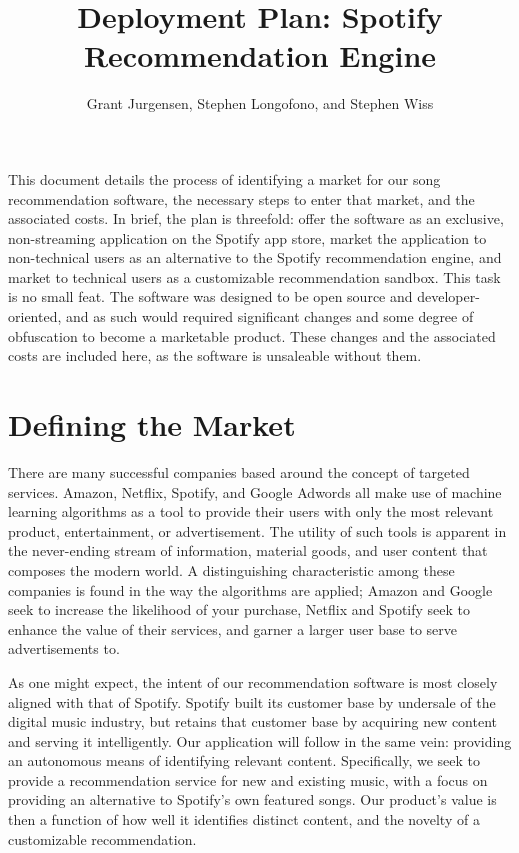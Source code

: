 \documentclass{roffin}
\begin{document}
\title{Deployment Plan: Spotify Recommendation Engine}

\author{Grant Jurgensen, Stephen Longofono, and Stephen Wiss}

\maketitle

This document details the process of identifying a market for our song recommendation software, the necessary steps to enter that market, and the associated costs.  In brief, the plan is threefold: offer the software as an exclusive, non-streaming application on the Spotify app store, market the application to non-technical users as an alternative to the Spotify recommendation engine, and market to technical users as a customizable recommendation sandbox.  This task is no small feat.  The software was designed to be open source and developer-oriented, and as such would required significant changes and some degree of obfuscation to become a marketable product.  These changes and the associated costs are included here, as the software is unsaleable without them.


\section{Defining the Market}
There are many successful companies based around the concept of targeted services.  Amazon, Netflix, Spotify, and Google Adwords all make use of machine learning algorithms as a tool to provide their users with only the most relevant product, entertainment, or advertisement.  The utility of such tools is apparent in the never-ending stream of information, material goods, and user content that composes the modern world.  A distinguishing characteristic among these companies is found in the way the algorithms are applied; Amazon and Google seek to increase the likelihood of your purchase, Netflix and Spotify seek to enhance the value of their services, and garner a larger user base to serve advertisements to.

As one might expect, the intent of our recommendation software is most closely aligned with that of Spotify.  Spotify built its customer base by undersale of the digital music industry, but retains that customer base by acquiring new content and serving it intelligently.  Our application will follow in the same vein: providing an autonomous means of identifying relevant content.  Specifically, we seek to provide a recommendation service for new and existing music, with a focus on providing an alternative to Spotify's own featured songs.  Our product's value is then a function of how well it identifies distinct content, and the novelty of a customizable recommendation.
\end{document}
